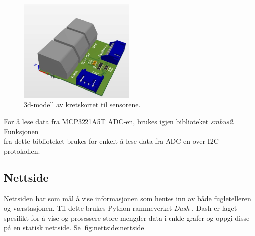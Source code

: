 \begin{figure}[H]
    \centering
    \includegraphics[width=0.5\textwidth]{implementering/sensorkretskort_3d.png}
    \caption{3d-modell av kretskortet til sensorene.}
    \label{fig:sensorkretskort_3d}
\end{figure}



For å lese data fra MCP3221A5T ADC-en, brukes igjen biblioteket \textit{smbus2}\cite{smbus2}. 
Funksjonen \\  fra dette biblioteket brukes for enkelt å lese data fra ADC-en over I2C-protokollen.  


\subsection{Nettside}\label{sec:impl:nettside}

Nettsiden har som mål å vise informasjonen som hentes inn av både fugletelleren og værstasjonen. 
Til dette brukes Python-rammeverket \textit{Dash} \cite{dash}. 
Dash er laget spesifikt for å vise og prosessere store mengder data i enkle grafer og oppgi disse på en statisk nettside. 
Se \autoref{fig:nettside:nettside}

